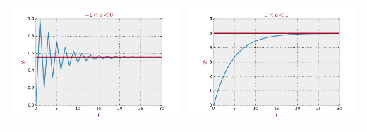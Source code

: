 \documentclass[10pt,usenames,dvipsnames]{beamer}
\theoremstyle{definition}
\begin{document}
\begin{frame}[fragile]
\begin{center}
\begin{tabular}{cc}
		\includegraphics[scale=0.3]{./figs/fig3} & \includegraphics[scale=0.3]{./figs/fig4}
\end{tabular}

\end{center}
\end{frame}
\end{document}

